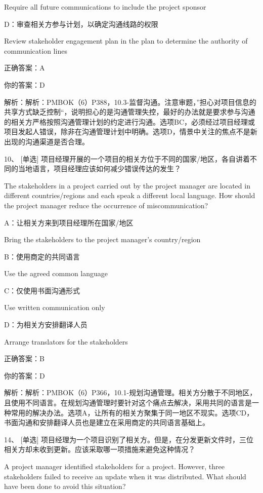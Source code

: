 Require all future communications to include the project sponsor

D：审查相关方参与计划，以确定沟通线路的权限

Review stakeholder engagement plan in the plan to determine the authority of communication lines

正确答案：A

你的答案：D

解析：解析：PMBOK（6）P388，10.3-监督沟通。注意审题，”担心对项目信息的共享方式缺乏控制“，说明担心的是沟通管理失控，最好的办法就是要求参与沟通的相关方严格按照沟通管理计划的约定进行沟通。选项BC，必须经过项目经理或项目发起人错误，除非在沟通管理计划中明确。选项D，情景中关注的焦点不是新出现的沟通渠道是否合理。



10、 [单选] 项目经理开展的一个项目的相关方位于不同的国家/地区，各自讲着不同的当地语言，项目经理应该如何减少错误传达的发生？

The stakeholders in a project carried out by the project manager are located in different countries/regions and each speak a different local language. How should the project manager reduce the occurrence of miscommunication?

A：让相关方来到项目经理所在国家/地区

Bring the stakeholders to the project manager's country/region

B：使用商定的共同语言

Use the agreed common language

C：仅使用书面沟通形式

Use written communication only

D：为相关方安排翻译人员

Arrange translators for the stakeholders

正确答案：B

你的答案：D

解析：解析：PMBOK（6）P366，10.1-规划沟通管理。相关方分散于不同地区，且使用不同语言。在规划沟通管理时要针对这个痛点去解决，采用共同的语言是一种常用的解决办法。选项A，让所有的相关方聚集于同一地区不现实。选项CD，书面沟通和安排翻译人员也是建立在采用商定的共同语言基础上。


14、 [单选] 项目经理为一个项目识别了相关方。但是，在分发更新文件时，三位相关方却未收到更新。应该采取哪一项措施来避免这种情况？

A project manager identified stakeholders for a project. However, three stakeholders failed to receive an update when it was distributed. What should have been done to avoid this situation?

